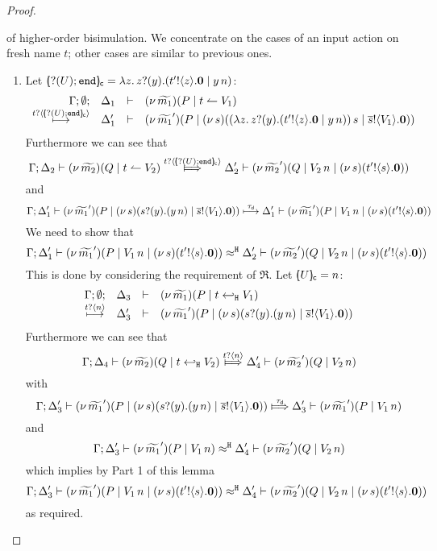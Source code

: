 \begin{proof}
\begin{enumerate}[$-$]
\begin{enumerate}
				of higher-order bisimulation.
				We concentrate on the cases of an input action on fresh name $t$; 
				other cases are similar to previous ones.
				\begin{enumerate}
					\item	Let $[\!\!(? (U) ; \mathtt{end})\!\!]_{\mathsf{c}} = \lambda z.\, z ? (y) . (t' ! \langle z \rangle . \mathbf{0} \;|\; y\, {n})$:
							\[
								\begin{array}{rcll} \Gamma; \emptyset; &\Delta_1& \vdash& (\nu\, \widetilde{m_1})(P \;|\; t \leftharpoonup V_1  ) \\ \stackrel{t ? \langle [\!\!(? (U) ; \mathtt{end})\!\!]_{\mathsf{c}} \rangle}{\longmapsto} &\Delta_1'& \vdash &  (\nu\, \widetilde{m_1}')(P \;|\; (\nu\, s)( (\lambda z.\, z ? (y) . (t' ! \langle z \rangle . \mathbf{0} \;|\; y\, {n}))\, {s} \;|\; \overline{s} ! \langle V_1 \rangle . \mathbf{0})) \end{array}
							\]
							Furthermore we can see that
							\[
								\horel{\Gamma}{\Delta_2}{\newsp{\widetilde{m_2}}{Q \Par \ntrigger{t}{V_2}  } }
								{\Hby{\bactinp{t}{\omapchar{\btinp{U} \tinact}}}}
								{\Delta_2'}{\newsp{\widetilde{m_2}'}{Q \Par \appl{V_2}{n} \Par \newsp{s}{\bout{t'}{s} \inact}}}
							\]
							and
							\[
								\Gamma; \Delta_1' \vdash (\nu\, \widetilde{m_1}')(P \;|\; (\nu\, s)(s ? (y) . (y\, {n}) \;|\; \overline{s} ! \langle V_1 \rangle . \mathbf{0})) \stackrel{\tau_{\mathsf{d}}}{\longmapsto} \Delta_1' \vdash (\nu\, \widetilde{m_1}')(P \;|\; V_1\, {n}\;|\; (\nu\, s)(t' ! \langle s \rangle . \mathbf{0}))
							\]
							We need to show that
							\[
								\Gamma; \Delta_1' \vdash (\nu\, \widetilde{m_1}')(P \;|\; V_1\, {n} \;|\; (\nu\, s)(t' ! \langle s \rangle . \mathbf{0})) \approx^\mathtt{H} \Delta_2' \vdash (\nu\, \widetilde{m_2}')(Q \;|\; V_2\, {n} \;|\; (\nu\, s)(t' ! \langle s \rangle . \mathbf{0}))
							\]
							This is done by considering the requirement of $\Re$.
							Let $[\!\!(U)\!\!]_{\mathsf{c}} = n$:
							\[
					\begin{array}{rcll} \Gamma; \emptyset; &\Delta_3& \vdash& (\nu\, \widetilde{m_1})(P \;|\; t \hookleftarrow_{\mathtt{H}} V_1  ) \\ \stackrel{t ? \langle n \rangle}{\longmapsto} &\Delta_3'& \vdash &  (\nu\, \widetilde{m_1}')(P \;|\; (\nu\, s)(s ? (y) . (y\, {n}) \;|\; \overline{s} ! \langle V_1 \rangle . \mathbf{0})) \end{array}
							\]
							Furthermore we can see that
							\[
								\horel{\Gamma}{\Delta_4}{\newsp{\widetilde{m_2}}{Q \Par \htrigger{t}{V_2}  } }
							{\Hby{\bactinp{t}{n}}}
			{\Delta_4'}{\newsp{\widetilde{m_2}'}{Q \Par \appl{V_2}{n}}}
							\]
							with
							\[
					\horel{\Gamma}{\Delta_3'}{\newsp{\widetilde{m_1}'}{P \Par \newsp{s}{\binp{s}{y}{(\appl{y}{n})} \Par \bout{\dual{s}}{V_1} \inact}}}
								{\Hby{\dtau}}
								{\Delta_3'}{\newsp{\widetilde{m_1}'}{P \Par \appl{V_1}{n}}}
							\]
							and
							\[
								\Gamma; \Delta_3' \vdash (\nu\, \widetilde{m_1}')(P \;|\; V_1\, {n}) \approx^\mathtt{H} \Delta_4' \vdash (\nu\, \widetilde{m_2}')(Q \;|\; V_2\, {n})
							\]
							which implies by Part 1 of this lemma
							\[
								\Gamma; \Delta_3' \vdash (\nu\, \widetilde{m_1}')(P \;|\; V_1\, {n} \;|\; (\nu\, s)(t' ! \langle s \rangle . \mathbf{0})) \approx^\mathtt{H} \Delta_4' \vdash (\nu\, \widetilde{m_2}')(Q \;|\; V_2\, {n} \;|\; (\nu\, s)(t' ! \langle s \rangle . \mathbf{0}))
							\]
							as required.


\end{enumerate}
\end{enumerate}
\end{enumerate}
\end{proof}
